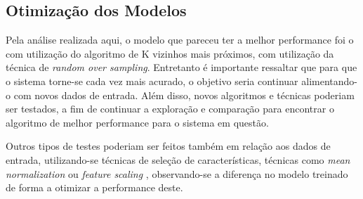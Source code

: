 		\subsection{Otimização dos Modelos}

			Pela análise realizada aqui, o modelo que pareceu ter a melhor performance foi o com utilização do algoritmo de K vizinhos mais próximos, com utilização da técnica de \emph{random over sampling}. Entretanto é importante ressaltar que para que o sistema torne-se cada vez mais acurado, o objetivo seria continuar alimentando-o com novos dados de entrada. Além disso, novos algoritmos e técnicas poderiam ser testados, a fim de continuar a exploração e comparação para encontrar o algoritmo de melhor performance para o sistema em questão.

			Outros tipos de testes poderiam ser feitos também em relação aos dados de entrada, utilizando-se técnicas de seleção de características, técnicas como \emph{mean normalization} ou \emph{feature scaling} \cite{Coursera}, observando-se a diferença no modelo treinado de forma a otimizar a performance deste.
